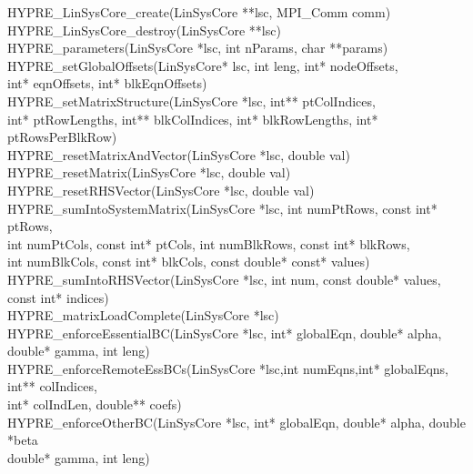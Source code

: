 \begin{tabbing}
{\sf HYPRE\_LinSysCore\_create(LinSysCore **lsc, MPI\_Comm comm)} \\[1mm]
{\sf HYPRE\_LinSysCore\_destroy(LinSysCore **lsc)} \\[1mm]
{\sf HYPRE\_parameters(LinSysCore *lsc, int nParams, char **params)} \\[1mm]
{\sf HYPRE\_setGlobalOffsets(LinSysCore* lsc, int leng, int* nodeOffsets,} \\
\hspace{1.0in} {\sf int* eqnOffsets, int* blkEqnOffsets)} \\[1mm]
{\sf HYPRE\_setMatrixStructure(LinSysCore *lsc, int** ptColIndices,} \\
\hspace{1.0in} {\sf int* ptRowLengths, int** blkColIndices, int* blkRowLengths, int* ptRowsPerBlkRow)} \\[1mm]
{\sf HYPRE\_resetMatrixAndVector(LinSysCore *lsc, double val)} \\[1mm]
{\sf HYPRE\_resetMatrix(LinSysCore *lsc, double val)} \\[1mm]
{\sf HYPRE\_resetRHSVector(LinSysCore *lsc, double val)} \\[1mm]
{\sf HYPRE\_sumIntoSystemMatrix(LinSysCore *lsc, int numPtRows, const int* ptRows,}\\
\hspace{1.0in} {\sf int numPtCols, const int* ptCols, int numBlkRows, const int* blkRows,} \\
\hspace{1.0in} {\sf int numBlkCols, const int* blkCols, const double* const* values)} \\[1mm]
{\sf HYPRE\_sumIntoRHSVector(LinSysCore *lsc, int num, const double* values, const int* indices)} \\[1mm]
{\sf HYPRE\_matrixLoadComplete(LinSysCore *lsc)} \\[1mm]
{\sf HYPRE\_enforceEssentialBC(LinSysCore *lsc, int* globalEqn, double* alpha,
                             double* gamma, int leng)} \\[1mm]

{\sf HYPRE\_enforceRemoteEssBCs(LinSysCore *lsc,int numEqns,int* globalEqns, int** colIndices,} \\
\hspace{1.0in} {\sf int* colIndLen, double** coefs)} \\[1mm]

{\sf HYPRE\_enforceOtherBC(LinSysCore *lsc, int* globalEqn, double* alpha, double *beta} \\
\hspace{1.0in} {\sf double* gamma, int leng)} \\[1mm]


\end{tabbing}
